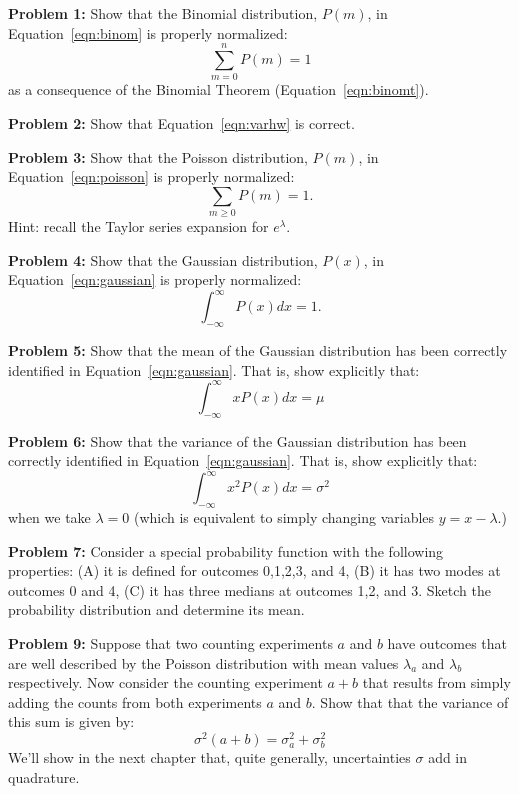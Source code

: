 \documentclass[12pt,oneside]{book}
\begin{document}
\noindent
{\bf Problem 1:} Show that the Binomial distribution, $P(m)$, in Equation~\ref{eqn:binom} is properly normalized:
\begin{displaymath}
\sum_{m=0}^n P(m) = 1
\end{displaymath}
as a consequence of the Binomial Theorem (Equation~\ref{eqn:binomt}).

\vskip 1cm
\noindent
{\bf Problem 2:} Show that Equation~\ref{eqn:varhw} is correct.

\vskip 1cm
\noindent
{\bf Problem 3:} Show that the Poisson distribution, $P(m)$, in Equation~\ref{eqn:poisson} is properly normalized:
\begin{displaymath}
\sum_{m \geq 0} P(m) = 1.
\end{displaymath}
Hint: recall the Taylor series expansion for $e^\lambda$.

\vskip 1cm
\noindent
{\bf Problem 4:} Show that the Gaussian distribution, $P(x)$, in Equation~\ref{eqn:gaussian} is properly normalized:
\begin{displaymath}
\int_{-\infty}^{\infty} P(x) dx = 1.
\end{displaymath}

\vskip 1cm
\noindent
{\bf Problem 5:} Show that the mean of the Gaussian distribution has been correctly identified in Equation~\ref{eqn:gaussian}.  That is, show explicitly that:
\begin{displaymath}
\int_{-\infty}^{\infty} x P(x) dx = \mu 
\end{displaymath}

\vskip 1cm
\noindent
{\bf Problem 6:} Show that the variance of the Gaussian distribution has been correctly identified in Equation~\ref{eqn:gaussian}.  That is, show explicitly that:
\begin{displaymath}
\int_{-\infty}^{\infty} x^2 P(x) dx = \sigma^2 
\end{displaymath}
when we take $\lambda=0$ (which is equivalent to simply changing variables $y=x-\lambda$.)

\vskip 1cm
\noindent
{\bf Problem 7:} Consider a special probability function with the following properties: (A) it is defined for outcomes 0,1,2,3, and 4, (B) it has two modes at outcomes 0 and 4, (C) it has three medians at outcomes 1,2, and 3.  Sketch the probability distribution and determine its mean. 

\noindent
{\bf Problem 9:} Suppose that two counting experiments $a$ and $b$ have outcomes that are well described by the Poisson distribution with mean values $\lambda_a$ and $\lambda_b$ respectively.  Now consider the counting
experiment $a+b$ that results from simply adding the counts from both experiments $a$ and $b$.  Show that that the variance of this sum is given by:
\begin{displaymath}
\sigma^2(a+b) = \sigma^2_a + \sigma^2_b
\end{displaymath}
We'll show in the next chapter that, quite generally, uncertainties $\sigma$ add in quadrature.

\newpage
\end{document}
